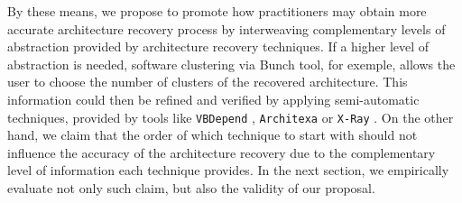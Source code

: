

By these means, we propose to promote how practitioners may obtain more accurate architecture recovery process by interweaving complementary levels of abstraction provided by architecture recovery techniques. If a higher level of abstraction is needed, software clustering via Bunch tool, for exemple, allows the user to choose the number of clusters of the recovered architecture. This information could then be refined and verified by applying semi-automatic techniques, provided by tools like \texttt{VBDepend} \cite{VBDepend}, \texttt{Architexa} \cite{Architexa} or \texttt{X-Ray} \cite{X-Ray}. On the other hand, we claim that the order of which technique to start with should not influence the accuracy of the architecture recovery due to the complementary level of information each technique provides. In the next section, we empirically evaluate not only such claim, but also the validity of our proposal.